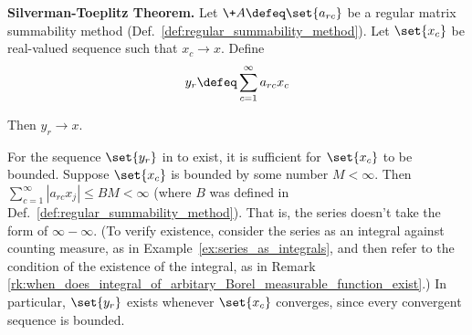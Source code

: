 \documentclass{article} %
\begin{document}
\begin{theorem}\textbf{Silverman-Toeplitz Theorem.}
Let $\+A \defeq \set{a_{rc}}$ be a regular matrix summability method (Def.~\ref{def:regular_summability_method}).  Let $\set{x_c}$ be real-valued sequence such that $x_c \to x$.  Define 
\begin{align}
y_r \defeq \sum_{c=1}^\infty a_{rc} x_c
\label{eqn:new_sequence_obtained_by_applying_a_regular_infinite_matrix_to_an_old_sequence}	
\end{align}

Then $y_r \to x.$
\label{thm:silverman_toeplitz}	
\end{theorem}

\begin{remark}
For the sequence $\set{y_r}$ in  to exist, it is sufficient for $\set{x_c}$ to be bounded.  Suppose $\set{x_c}$ is bounded by some number $M<\infty$.  Then $\sum_{c=1}^\infty |a_{rc} x_j| \leq BM < \infty$ (where $B$ was defined in Def.~\ref{def:regular_summability_method}). That is,  the series doesn't take the form of $\infty - \infty$. {\scriptsize (To verify existence,  consider the series as an integral against counting measure, as in Example~\ref{ex:series_as_integrals}, and then refer to the condition of the existence of the integral, as in Remark \ref{rk:when_does_integral_of_arbitary_Borel_measurable_function_exist}.)} In particular, $\set{y_r}$ exists whenever $\set{x_c}$ converges, since every convergent sequence is bounded. %
\end{remark}
\end{document}
